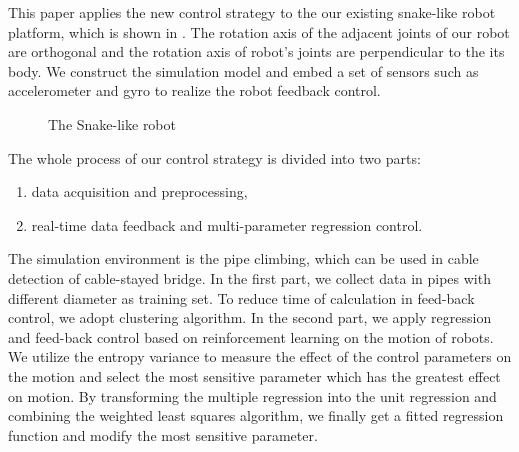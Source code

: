 This paper applies the new control strategy to the our existing snake-like robot platform, which is shown in . The rotation axis of the adjacent joints of our robot are orthogonal and the rotation axis of robot's joints are perpendicular to the its body. We construct the simulation model  and embed a set of sensors such as accelerometer and gyro to realize the robot feedback control.
\begin{figure}[H]
	\centering
	\caption{The Snake-like robot}
\end{figure}

The whole process of our control strategy is divided into two parts:

\begin{enumerate}
	\item data acquisition and preprocessing,
	\item real-time data feedback and multi-parameter regression control.
\end{enumerate}

The simulation environment is the pipe climbing, which can be used in cable detection of cable-stayed bridge. In the first part, we collect data in pipes with different diameter as training set. To reduce time of calculation in feed-back control, we adopt clustering algorithm\cite{Cluseter_ICT}\cite{KmeansAndDeepLearning}. In the second part, we apply regression and feed-back control based on reinforcement learning on the motion of robots. We utilize the entropy variance\cite{WaveformEntropyVariance}\cite{EntropyandVarianceasRiskMeasure}\cite{UsingEntropyAndVariance} to measure the effect of the control parameters on the motion and select the most sensitive parameter which has the greatest effect on motion. By transforming the multiple regression into the unit regression and combining the weighted least squares algorithm\cite{gradientMethod}\cite{MSEestimates}, we finally get a fitted regression function and modify the most sensitive parameter.

